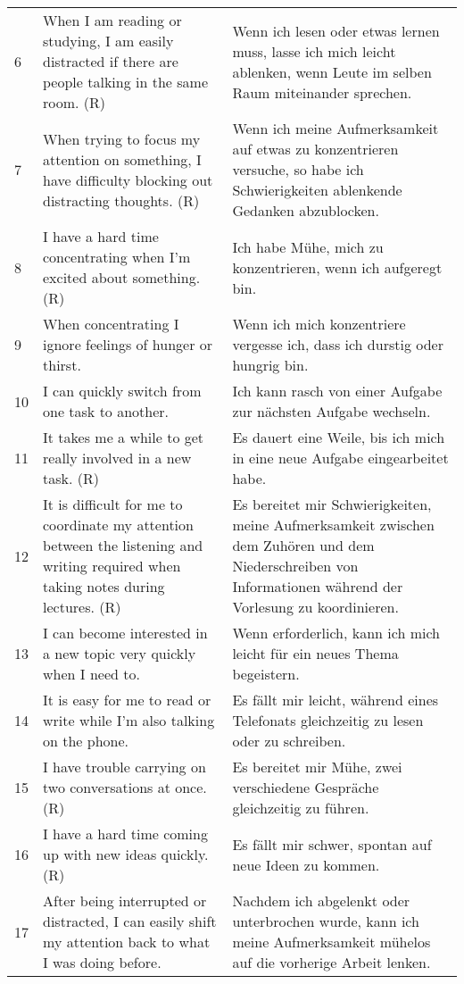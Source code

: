 \begin{RaggedRight}
\begin{center}
\begin{longtable}[t]{|l|p{6.6 cm}|p{6.6 cm}|}
        6 & When I am reading or studying, I am easily distracted if there are people talking in the same room. (R) & Wenn ich lesen oder etwas lernen muss, lasse ich mich leicht ablenken, wenn Leute im selben Raum miteinander sprechen. \\
        7 & When trying to focus my attention on something, I have difficulty blocking out distracting thoughts. (R) & Wenn ich meine Aufmerksamkeit auf etwas zu konzentrieren versuche, so habe ich Schwierigkeiten ablenkende Gedanken abzublocken. \\
        8 & I have a hard time concentrating when I’m excited about something. (R) & Ich habe Mühe, mich zu konzentrieren, wenn ich aufgeregt bin. \\
        9 & When concentrating I ignore feelings of hunger or thirst. & Wenn ich mich konzentriere vergesse ich, dass ich durstig oder hungrig bin. \\
        10 & I can quickly switch from one task to another. & Ich kann rasch von einer Aufgabe zur nächsten Aufgabe wechseln. \\
        11 & It takes me a while to get really involved in a new task. (R) & Es dauert eine Weile, bis ich mich in eine neue Aufgabe eingearbeitet habe. \\
        12 & It is difficult for me to coordinate my attention between the listening and writing required when taking notes during lectures. (R) & Es bereitet mir Schwierigkeiten, meine Aufmerksamkeit zwischen dem Zuhören und dem Niederschreiben von Informationen während der Vorlesung zu koordinieren. \\
        13 & I can become interested in a new topic very quickly when I need to. & Wenn erforderlich, kann ich mich leicht für ein neues Thema begeistern.  \\
        14 & It is easy for me to read or write while I’m also talking on the phone. & Es fällt mir leicht, während eines Telefonats gleichzeitig zu lesen oder zu schreiben.  \\
        15 & I have trouble carrying on two conversations at once. (R) & Es bereitet mir Mühe, zwei verschiedene Gespräche gleichzeitig zu führen. \\
        16 & I have a hard time coming up with new ideas quickly. (R) & Es fällt mir schwer, spontan auf neue Ideen zu kommen. \\
        17 & After being interrupted or distracted, I can easily shift my attention back to what I was doing before. & Nachdem ich abgelenkt oder unterbrochen wurde, kann ich meine Aufmerksamkeit mühelos auf die vorherige Arbeit lenken. \\

\end{longtable}
\end{center}
\end{RaggedRight}
